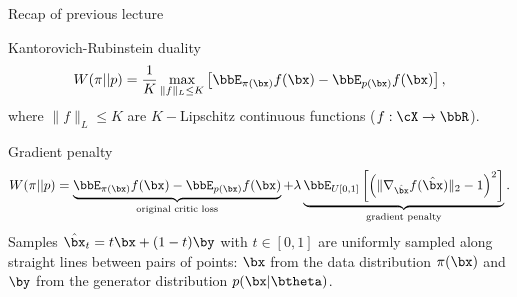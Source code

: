 

\begin{frame}
\titlepage
\end{frame}
\begin{frame}{Recap of previous lecture}
	\begin{block}{Kantorovich-Rubinstein duality}
		\vspace{-0.2cm}
		\[
			W(\pi || p) = \frac{1}{K} \max_{\| f \|_L \leq K} \left[ \bbE_{\pi(\bx)} f(\bx)  - \bbE_{p(\bx)} f(\bx)\right],
		\]
		where $\| f \|_L \leq K$ are $K-$Lipschitz continuous functions ($f: \cX \rightarrow \bbR$).
	\end{block}
	\begin{block}{Gradient penalty}
		\vspace{-0.3cm}
		\[
			W(\pi || p) = \underbrace{\bbE_{\pi(\bx)} f(\bx)  - \bbE_{p(\bx)} f(\bx)}_{\text{original critic loss}} + \lambda \underbrace{\bbE_{U[0, 1]} \left[ \left( \| \nabla_{\hat{\bx}} f(\hat{\bx}) \|_2 - 1 \right) ^ 2\right]}_{\text{gradient penalty}}.
		\]
		Samples $\hat{\bx}_t = t \bx + (1 - t) \by$ with $t \in [0, 1]$ are uniformly sampled along straight lines between pairs of points: $\bx$ from the data distribution $\pi(\bx)$ and $\by$ from the generator distribution $p(\bx | \btheta)$.
	\end{block}
\end{frame}

